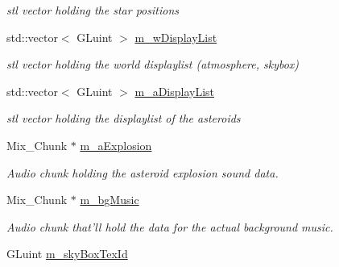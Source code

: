 \begin{DoxyCompactItemize}
\begin{DoxyCompactList}\small\item\em stl vector holding the star positions \item\end{DoxyCompactList}\item 
\hypertarget{classWorld_a6b528ace279b3e4421eafb30880e6471}{
std::vector$<$ GLuint $>$ \hyperlink{classWorld_a6b528ace279b3e4421eafb30880e6471}{m\_\-wDisplayList}}
\label{classWorld_a6b528ace279b3e4421eafb30880e6471}

\begin{DoxyCompactList}\small\item\em stl vector holding the world displaylist (atmosphere, skybox) \item\end{DoxyCompactList}\item 
\hypertarget{classWorld_a03863f462870a166d787483af999617b}{
std::vector$<$ GLuint $>$ \hyperlink{classWorld_a03863f462870a166d787483af999617b}{m\_\-aDisplayList}}
\label{classWorld_a03863f462870a166d787483af999617b}

\begin{DoxyCompactList}\small\item\em stl vector holding the displaylist of the asteroids \item\end{DoxyCompactList}\item 
\hypertarget{classWorld_a231cda33e6e569e72479289e030b1e08}{
Mix\_\-Chunk $\ast$ \hyperlink{classWorld_a231cda33e6e569e72479289e030b1e08}{m\_\-aExplosion}}
\label{classWorld_a231cda33e6e569e72479289e030b1e08}

\begin{DoxyCompactList}\small\item\em Audio chunk holding the asteroid explosion sound data. \item\end{DoxyCompactList}\item 
\hypertarget{classWorld_a70cc3d6885284803dc0ba6d55c79e2d9}{
Mix\_\-Chunk $\ast$ \hyperlink{classWorld_a70cc3d6885284803dc0ba6d55c79e2d9}{m\_\-bgMusic}}
\label{classWorld_a70cc3d6885284803dc0ba6d55c79e2d9}

\begin{DoxyCompactList}\small\item\em Audio chunk that'll hold the data for the actual background music. \item\end{DoxyCompactList}\item 
\hypertarget{classWorld_a46c0338665c6bf3a59f4830e446ef8d0}{
GLuint \hyperlink{classWorld_a46c0338665c6bf3a59f4830e446ef8d0}{m\_\-skyBoxTexId}}
\label{classWorld_a46c0338665c6bf3a59f4830e446ef8d0}


\end{DoxyCompactItemize}

